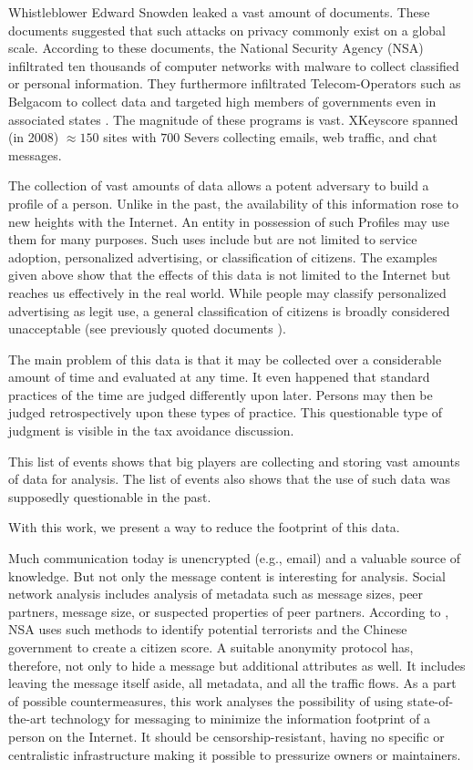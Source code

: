 \documentclass[acmsmall, screen]{acmart}
\begin{document}
Whistleblower Edward Snowden leaked a vast amount of documents. These documents suggested that such attacks on privacy commonly exist on a global scale. According to these documents, the National Security Agency (NSA) infiltrated ten thousands of computer networks with malware to collect classified or personal information. They furthermore infiltrated Telecom-Operators such as Belgacom to collect data and targeted high members of governments even in associated states \cite{NCR2013,XKeyscore,Ball2013,Ackerman2013,Greenberg2013}. The magnitude of these programs is vast. XKeyscore spanned (in 2008) $\approx150$ sites with $700$ Severs collecting emails, web traffic, and chat messages.

The collection of vast amounts of data allows a potent adversary to build a  profile of a person. Unlike in the past, the availability of this information rose to new heights with the Internet. An entity in possession of such Profiles may use them for many purposes. Such uses include but are not limited to service adoption, personalized advertising, or classification of citizens. The examples given above show that the effects of this data is not limited to the Internet but reaches us effectively in the real world. While people may classify personalized advertising as legit use, a general classification of citizens is broadly considered unacceptable (see previously quoted documents \cite{NCR2013,XKeyscore,Ball2013,Greenberg2013,Leuenberger1989}).

The main problem of this data is that it may be collected over a considerable amount of time and evaluated at any time. It even happened that standard practices of the time are judged differently upon later. Persons may then be judged retrospectively upon these types of practice. This questionable type of judgment is visible in the tax avoidance discussion\cite{Amat1999}. 

This list of events shows that big players are collecting and storing vast amounts of data for analysis. The list of events also shows that the use of such data was supposedly questionable in the past. 

With this work, we present a way to reduce the footprint of this data.

Much communication today is unencrypted (e.g., email) and a valuable source of knowledge. But not only the message content is interesting for analysis. Social network analysis includes analysis of metadata such as message sizes, peer partners, message size, or suspected properties of peer partners. According to \cite{Ackerman2013}, NSA uses such methods to identify potential terrorists and the Chinese government to create a citizen score. A suitable anonymity protocol has, therefore, not only to hide a message but additional attributes as well. It includes leaving the message itself aside, all metadata, and all the traffic flows. As a part of possible countermeasures, this work analyses the possibility of using state-of-the-art technology for messaging to minimize the information footprint of a person on the Internet. It should be censorship-resistant, having no specific or centralistic infrastructure making it possible to pressurize owners or maintainers. 
\end{document}

